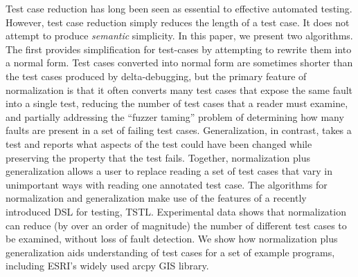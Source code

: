 Test case reduction has long been seen as essential to effective automated testing.  However, test case reduction simply reduces the length of a test case.  It does not attempt to produce \emph{semantic} simplicity.  In this paper, we present two algorithms.  The first provides simplification for test-cases by attempting to rewrite them into a normal form.  Test cases converted into normal form are sometimes shorter than the test cases produced by delta-debugging, but the primary feature of normalization is that it often converts many test cases that expose the same fault into a single test, reducing the number of test cases that a reader must examine, and partially addressing the ``fuzzer taming'' problem of determining how many faults are present in a set of failing test cases.  Generalization, in contrast, takes a test and reports what aspects of the test could have been changed while preserving the property that the test fails.  Together, normalization plus generalization allows a user to replace reading a set of test cases that vary in unimportant ways with reading one annotated test case.  The algorithms for normalization and generalization make use of the features of a recently introduced DSL for testing, TSTL.  Experimental data shows that normalization can reduce (by over an order of magnitude) the number of different test cases to be examined, without loss of fault detection.  We show how normalization plus generalization aids understanding of test cases for a set of example programs, including ESRI's widely used arcpy GIS library.